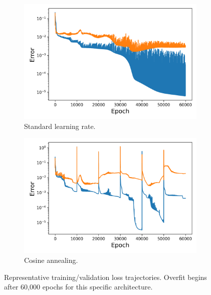 \begin{figure}[H]
	\centering
	\begin{subfigure}{.45\textwidth}
		\centering
		\includegraphics[width=1\linewidth]{./figs/sm_rep_loss_plot.png}  
		\caption{Standard learning rate.}
	\end{subfigure}
	\begin{subfigure}{.45\textwidth}
		\centering
		\includegraphics[width=1\linewidth]{./figs/snap_rep_loss_plot.png}  
		\caption{Cosine annealing.}
	\end{subfigure}
	\caption{Representative training/validation loss trajectories. Overfit begins after 60,000 epochs for this specific architecture.}
\end{figure}
